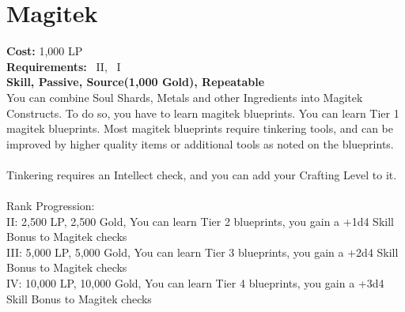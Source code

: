 \section{Magitek}\label{perk:magitek}
\textbf{Cost:} 1,000 LP\\
\textbf{Requirements:}~ II,~ I\\
\textbf{Skill, Passive, Source(1,000 Gold), Repeatable}\\
You can combine Soul Shards, Metals and other Ingredients into Magitek Constructs.
To do so, you have to learn magitek blueprints.
You can learn Tier 1 magitek blueprints.
Most magitek blueprints require tinkering tools, and can be improved by higher quality items or additional tools as noted on the blueprints.\\
\\
Tinkering requires an Intellect check, and you can add your Crafting Level to it.\\
\\
Rank Progression:\\
II: 2,500 LP, 2,500 Gold, You can learn Tier 2 blueprints, you gain a +1d4 Skill Bonus to Magitek checks\\
III: 5,000 LP, 5,000 Gold, You can learn Tier 3 blueprints, you gain a +2d4 Skill Bonus to Magitek checks\\
IV: 10,000 LP, 10,000 Gold, You can learn Tier 4 blueprints, you gain a +3d4 Skill Bonus to Magitek checks\\
